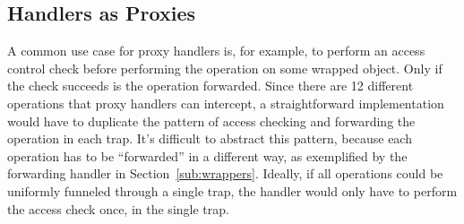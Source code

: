 \documentclass{sig-alternate}
\begin{document}

%
%
%

\subsection{Handlers as Proxies}
\label{sub:doublelifting}

A common use case for proxy handlers is, for example, to perform an access control check before performing the operation on some wrapped object. Only if the check succeeds is the operation forwarded. Since there are 12 different operations that proxy handlers can intercept, a straightforward implementation would have to duplicate the pattern of access checking and forwarding the operation in each trap. It's difficult to abstract this pattern, because each operation has to be ``forwarded'' in a different way, as exemplified by the forwarding handler in Section~\ref{sub:wrappers}. Ideally, if all operations could be uniformly funneled through a single trap, the handler would only have to perform the access check once, in the single trap.
\end{document}
